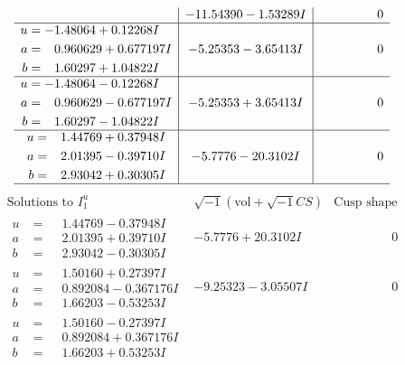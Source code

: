 \documentclass[1p]{elsarticle_modified}
\theoremstyle{definition}
\newcommand{\I}{\sqrt{-1}}
\begin{document}
$$\begin{array}{c|c|c}
 & -11.54390 - 1.53289 I & \phantom{-0.000000 } 0 \\ \hline\begin{aligned}
u &= -1.48064 + 0.12268 I \\
a &= \phantom{-}0.960629 + 0.677197 I \\
b &= \phantom{-}1.60297 + 1.04822 I\end{aligned}
 & -5.25353 - 3.65413 I & \phantom{-0.000000 } 0 \\ \hline\begin{aligned}
u &= -1.48064 - 0.12268 I \\
a &= \phantom{-}0.960629 - 0.677197 I \\
b &= \phantom{-}1.60297 - 1.04822 I\end{aligned}
 & -5.25353 + 3.65413 I & \phantom{-0.000000 } 0 \\ \hline\begin{aligned}
u &= \phantom{-}1.44769 + 0.37948 I \\
a &= \phantom{-}2.01395 - 0.39710 I \\
b &= \phantom{-}2.93042 + 0.30305 I\end{aligned}
 & -5.7776 - 20.3102 I & \phantom{-0.000000 } 0\\
 \hline 
 \end{array}$$\newpage$$\begin{array}{c|c|c}  
\text{Solutions to }I^u_{1}& \I (\text{vol} + \sqrt{-1}CS) & \text{Cusp shape}\\
 \hline 
\begin{aligned}
u &= \phantom{-}1.44769 - 0.37948 I \\
a &= \phantom{-}2.01395 + 0.39710 I \\
b &= \phantom{-}2.93042 - 0.30305 I\end{aligned}
 & -5.7776 + 20.3102 I & \phantom{-0.000000 } 0 \\ \hline\begin{aligned}
u &= \phantom{-}1.50160 + 0.27397 I \\
a &= \phantom{-}0.892084 - 0.367176 I \\
b &= \phantom{-}1.66203 - 0.53253 I\end{aligned}
 & -9.25323 - 3.05507 I & \phantom{-0.000000 } 0 \\ \hline\begin{aligned}
u &= \phantom{-}1.50160 - 0.27397 I \\
a &= \phantom{-}0.892084 + 0.367176 I \\
b &= \phantom{-}1.66203 + 0.53253 I\end{aligned}

\end{array}$$
\end{document}
